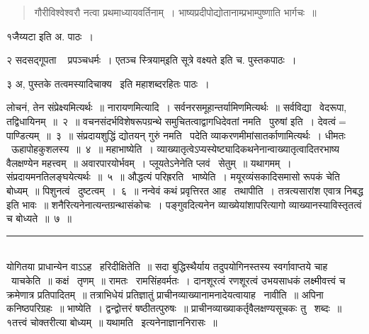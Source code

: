 \documentclass[11pt, openany]{book}
\makeatletter
\newcommand{\devanagarinumeral}[1]{
\devanagaridigits{\number \csname c@#1\endcsname}} %
\makeatother
\begin{document}
\begin{quote}
{\qt गौरीविश्वेश्वरौ नत्वा प्रथमाध्यायवर्तिनाम्~। भाष्यप्रदीपोद्योतानाम्प्रभाम्पुष्णाति भार्गचः~॥}
\end{quote}

१जैय्यटा इति अ. पाठः~। 

२ {\qt सदसद्गूपता \textendash\ } प्रपञ्चधर्मः~। एतञ्च स्त्रियाम्{\qt इति सूत्रे वक्ष्यते} इति च. पुस्तकपाठः~। 

३ अ, पुस्तके तत्वमस्यादिचाक्य \textendash\ इति महाशब्दरहितः पाठः~। 

\fancyhead[RE]{[ १ अ. १ पा. १ आह्निके}
\fancyhead[LO]{शास्त्रप्रयोजनाधिकरणम् ] }
\fancyhead[LE,RO]{\thepage}
\cfoot{}
\newpage
\renewcommand{\thepage}{\devanagarinumeral{page}}
\setcounter{page}{4}


\noindent
लोचनं, तेन संप्रेक्ष्यमित्यर्थः~॥ नारायणमित्यादि~। सर्वनरसमूहान्तर्यामिणमित्यर्थः~॥ सर्वविद्या \textendash\ वेदरूपा, तद्विधायिनम्~॥~२~॥ वचनसंदर्भविशेषरूपग्रन्थे समुचितत्वाद्वागधिदेवतां नमति \textendash\ पुरुषां इति~। देवत्वं$=$पाण्डित्यम्~॥~३~॥ संप्रदायशुद्धिं द्योतयन् गुरुं नमति \textendash\ पदेति व्याकरणमीमांसातर्काणामित्यर्थः~। धीमतः \textendash\ ऊहापोहकुशलस्य~॥~४~॥ महाभाष्येति~। व्याख्यातृत्वेऽप्यस्येष्ट्यादिकथनेनान्वाख्यातृत्वादितरभाष्य वैलक्षण्येन महत्त्वम्~॥ अवारपारयोर्भवम्~। प्लूयतेऽनेनेति प्लवं \textendash\ सेतुम्~॥ यथागमम्~। संप्रदायमनतिलङ्घयेत्यर्थः~॥~५~॥ औद्धत्यं परिह्ररति \textendash\ भाष्येति~। मयूरव्यंसकादिसमासो रूपकं चेति बोध्यम्~॥ पिशुनत्वं \textendash\ दुष्टत्वम्~।~६~॥ नन्वेवं कथं प्रवृत्तिरत आह \textendash\ तथापीति~। तत्रत्यसारांश एवात्र निबद्ध इति भावः~॥ शनैरित्यनेनात्यन्तग्रन्थासंकोचः~। पङ्गुवदित्यनेन व्याख्येयांशापरित्यागो व्याख्यानस्याविस्तृतत्वं च बोध्यते~॥~७~॥

\noindent
\rule{1\linewidth}{0.5pt}\\

योगितया प्राधान्येन वाऽऽह \textendash\ हरिदीक्षितेति~॥ सदा बुद्धिस्थैर्याय तदुपयोगिनस्तस्य स्वर्गावाप्तये चाह \textendash\ याचकेति~॥ कक्षं \textendash\ तृणम्~॥ रामतः \textendash\ रामसिंहवर्मतः~। दानशूरत्वं रणशूरत्वं उभयसाधकं लक्ष्मीवत्त्वं च क्रमेणात्र प्रतिपादितम्~॥ तत्राभिधेयं प्रतिज्ञातुं प्राचीनव्याख्यानामनादेयत्वायाह \textendash\ नावीति~॥ अपिना कनिष्ठपरिग्रहः~॥ भाष्येति~। द्वन्द्वोत्तरं षष्ठीतत्पुरुषः~॥ प्राचीनव्याख्याकर्तृवैलक्षण्यसूचकः {\qt तु} \textendash\ शब्दः~॥ १तत्त्वं चोक्तरीत्या बोध्यम्~॥ यथामति \textendash\ इत्यनेनाज्ञाननिरासः~॥\\
\end{document}

